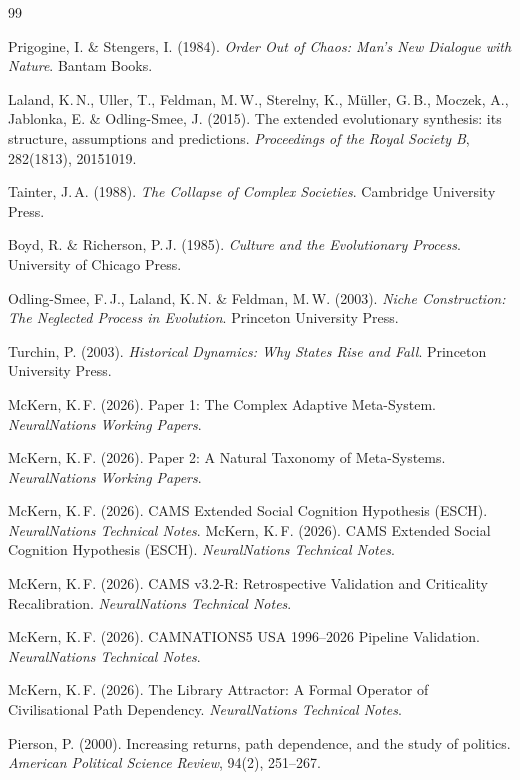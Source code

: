 \documentclass[12pt,a4paper]{article}
\begin{document}
\newpage
\begin{thebibliography}{99}

Prigogine, I. \& Stengers, I. (1984). \textit{Order Out of Chaos: Man's New Dialogue with Nature}. Bantam Books.

Laland, K.\,N., Uller, T., Feldman, M.\,W., Sterelny, K., M\"{u}ller, G.\,B., Moczek, A., Jablonka, E. \& Odling-Smee, J. (2015). The extended evolutionary synthesis: its structure, assumptions and predictions. \textit{Proceedings of the Royal Society B}, 282(1813), 20151019.

Tainter, J.\,A. (1988). \textit{The Collapse of Complex Societies}. Cambridge University Press.

Boyd, R. \& Richerson, P.\,J. (1985). \textit{Culture and the Evolutionary Process}. University of Chicago Press.

Odling-Smee, F.\,J., Laland, K.\,N. \& Feldman, M.\,W. (2003). \textit{Niche Construction: The Neglected Process in Evolution}. Princeton University Press.

Turchin, P. (2003). \textit{Historical Dynamics: Why States Rise and Fall}. Princeton University Press.

McKern, K.\,F. (2026). Paper 1: The Complex Adaptive Meta-System. \textit{NeuralNations Working Papers}.

McKern, K.\,F. (2026). Paper 2: A Natural Taxonomy of Meta-Systems. \textit{NeuralNations Working Papers}.

McKern, K.\,F. (2026). CAMS Extended Social Cognition Hypothesis (ESCH). \textit{NeuralNations Technical Notes}.
McKern, K.\,F. (2026). CAMS Extended Social Cognition Hypothesis (ESCH). \textit{NeuralNations Technical Notes}.

McKern, K.\,F. (2026). CAMS v3.2-R: Retrospective Validation and Criticality Recalibration. \textit{NeuralNations Technical Notes}.

McKern, K.\,F. (2026). CAMNATIONS5 USA 1996--2026 Pipeline Validation. \textit{NeuralNations Technical Notes}.

McKern, K.\,F. (2026). The Library Attractor: A Formal Operator of Civilisational Path Dependency. \textit{NeuralNations Technical Notes}.

Pierson, P. (2000). Increasing returns, path dependence, and the study of politics. \textit{American Political Science Review}, 94(2), 251--267.

\end{thebibliography}
\end{document}
